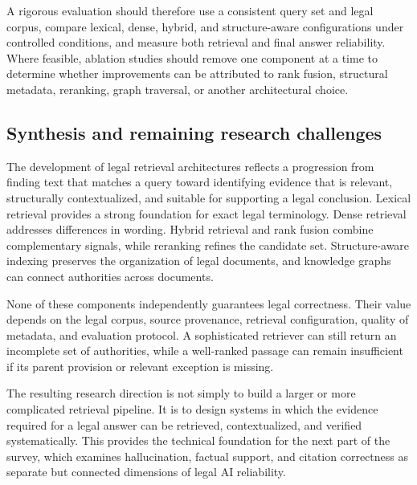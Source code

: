 A rigorous evaluation should therefore use a consistent query set and legal corpus, compare lexical,
dense, hybrid, and structure-aware configurations under controlled conditions, and measure both
retrieval and final answer reliability. Where feasible, ablation studies should remove one component at
a time to determine whether improvements can be attributed to rank fusion, structural metadata,
reranking, graph traversal, or another architectural choice.

\subsection{Synthesis and remaining research challenges}

The development of legal retrieval architectures reflects a progression from finding text that matches
a query toward identifying evidence that is relevant, structurally contextualized, and suitable for
supporting a legal conclusion. Lexical retrieval provides a strong foundation for exact legal
terminology. Dense retrieval addresses differences in wording. Hybrid retrieval and rank fusion combine
complementary signals, while reranking refines the candidate set. Structure-aware indexing preserves
the organization of legal documents, and knowledge graphs can connect authorities across documents.

None of these components independently guarantees legal correctness. Their value depends on the legal
corpus, source provenance, retrieval configuration, quality of metadata, and evaluation protocol. A
sophisticated retriever can still return an incomplete set of authorities, while a well-ranked passage
can remain insufficient if its parent provision or relevant exception is missing.

The resulting research direction is not simply to build a larger or more complicated retrieval
pipeline. It is to design systems in which the evidence required for a legal answer can be retrieved,
contextualized, and verified systematically. This provides the technical foundation for the next part
of the survey, which examines hallucination, factual support, and citation correctness as separate but
connected dimensions of legal AI reliability.
